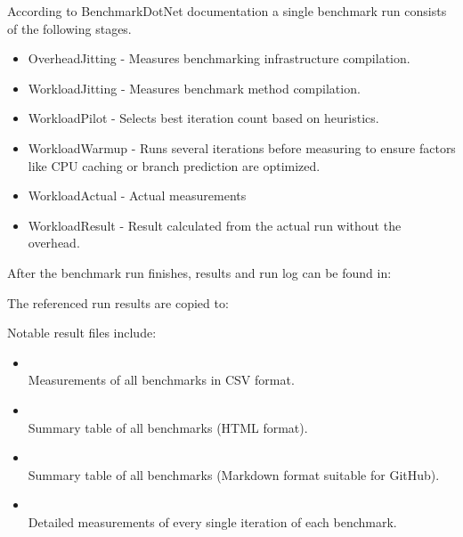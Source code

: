 According to BenchmarkDotNet documentation\cite{BenchmarkDotNetHow} a single benchmark run consists of the following stages.
\begin{itemize}
    \item OverheadJitting - Measures benchmarking infrastructure compilation.
    \item WorkloadJitting - Measures benchmark method compilation.
    \item WorkloadPilot - Selects best iteration count based on heuristics.
    \item WorkloadWarmup - Runs several iterations before measuring to ensure factors like CPU caching or branch prediction are optimized.
    \item WorkloadActual - Actual measurements
    \item WorkloadResult - Result calculated from the actual run without the overhead.
\end{itemize}

After the benchmark run finishes, results and run log can be found in:

\smallskip
\noindent{}

\smallskip
The referenced run results are copied to:

\smallskip
\noindent{}

\smallskip
Notable result files include:
\begin{itemize}
    \item {}\\
    Measurements of all benchmarks in CSV format.

    \item {}\\
    Summary table of all benchmarks (HTML format).

    \item {}\\
    Summary table of all benchmarks (Markdown format suitable for GitHub).

    \item {}\\
    Detailed measurements of every single iteration of each benchmark.
\end{itemize}

